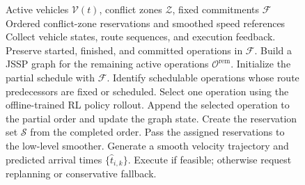 \begin{figure}[!t]
\centering
{\color{addedblue}
\begin{algorithmic}[1]
\REQUIRE Active vehicles $\mathcal{V}(t)$, conflict zones $\mathcal{Z}$, fixed commitments $\mathcal{F}$
\ENSURE Ordered conflict-zone reservations and smoothed speed references
\STATE Collect vehicle states, route sequences, and execution feedback.
  \STATE Preserve started, finished, and committed operations in $\mathcal{F}$.
  \STATE Build a JSSP graph for the remaining active operations $\mathcal{O}^{\mathrm{rem}}$.
  \STATE Initialize the partial schedule with $\mathcal{F}$.
    \STATE Identify schedulable operations whose route predecessors are fixed or scheduled.
    \STATE Select one operation using the offline-trained RL policy rollout.
    \STATE Append the selected operation to the partial order and update the graph state.
  \ENDWHILE
  \STATE Create the reservation set $\mathcal{S}$ from the completed order.
\ENDIF
{}
  \STATE Pass the assigned reservations to the low-level smoother.
  \STATE Generate a smooth velocity trajectory and predicted arrival times $\{\hat{t}_{i,k}\}$.
  \STATE Execute if feasible; otherwise request replanning or conservative fallback.
\ENDFOR
\end{algorithmic}}
\caption{}
\label{alg:hierarchical_scheduler}
\end{figure}




